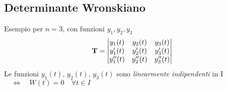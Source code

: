 \documentclass[a4paper,10pt,italian]{article}
\begin{document}
\subsection{Determinante Wronskiano}
Esempio per $n=3$, con funzioni $y_1,y_2,y_3$
\begin{equation*}
{\bf T} = 
\begin{vmatrix}

y_1(t) & y_2(t) & y_3(t) \\
y'_1(t) & y'_2(t) & y'_3(t) \\
y''_1(t) & y''_2(t) & y''_3(t) \\

\end{vmatrix}
\end{equation*}
Le funzioni $y_1(t)$, $y_2(t)$, $y_3(t)$ sono \emph{linearmente indipendenti} in I $\quad \Leftrightarrow \quad W(t) = 0 \quad \forall t \in I$ 




\end{document}
